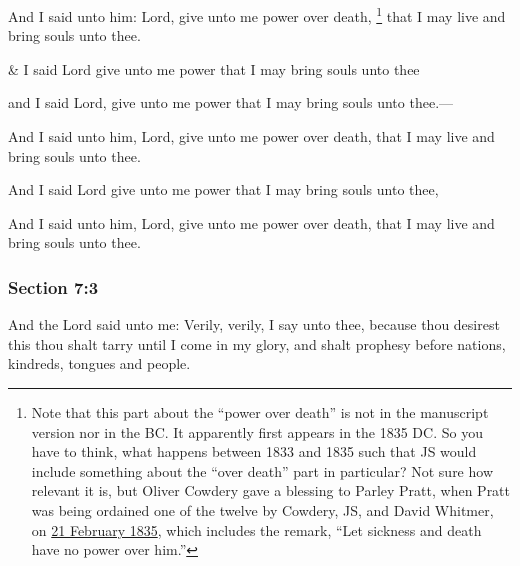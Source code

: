 		And I said unto him: Lord, give unto me power over death,%
			\footnote{%
				Note that this part about the ``power over death'' is not in the manuscript version nor in the BC. It apparently first appears in the 1835 DC. So you have to think, what happens between 1833 and 1835 such that JS would include something about the ``over death'' part in particular? Not sure how relevant it is, but Oliver Cowdery gave a blessing to Parley Pratt, when Pratt was being ordained one of the twelve by Cowdery, JS, and David Whitmer, on \hyperref[EMS-1835-JS-21-FEB-1835]{21 February 1835}, which includes the remark, ``Let sickness and death have no power over him.''
				}
		that I may live and bring souls unto thee.

		\begin{framed}
		\scriptsize
			\begin{compactdesc}
				\item[JSP] \& I said Lord give unto me power that I may bring souls unto thee 
				\item[BC] and I said Lord, give unto me power that I may bring souls unto thee.---
				\item[DC 1835] And I said unto him, Lord, give unto me power over death, that I may live and bring souls unto thee.
				\item[FGW] And I said Lord give unto me power that I may bring souls unto thee, 
				\item[DC 1844] And I said unto him, Lord, give unto me power over death, that I may live and bring souls unto thee.
			\end{compactdesc}
		\end{framed}

	\subsubsection{Section 7:3} %
		\label{DC7-3}

		And the Lord said unto me: Verily, verily, I say unto thee, because thou desirest this thou shalt tarry until I come in my glory, and shalt prophesy before nations, kindreds, tongues and people.

